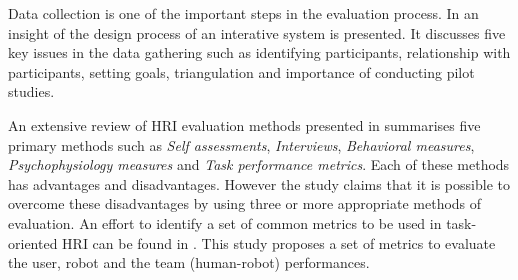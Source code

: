 Data collection is one of the important steps in the evaluation process. In \cite{Rogers2011} an insight of the design process of an interative system is presented. It discusses five key issues in the data gathering such as identifying participants, relationship with participants, setting goals, triangulation and importance of conducting pilot studies.

An extensive review of HRI evaluation methods presented in \cite{bethel2010review} summarises five primary methods such as \emph{Self assessments}, \emph{Interviews}, \emph{Behavioral measures}, \emph{Psychophysiology measures} and \emph{Task performance metrics}. Each of these methods has advantages and disadvantages. However the study claims that it is possible to overcome these disadvantages by using three or more appropriate methods of evaluation. An effort to identify a set of common metrics to be used in task-oriented HRI can be found in \cite{Steinfeld2006}. This study proposes a set of metrics to evaluate the user, robot and the team (human-robot) performances.
  
                                          
